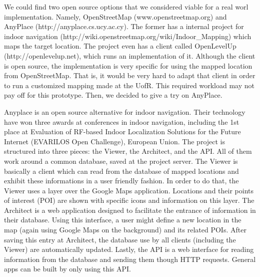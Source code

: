We could find two open source options that we considered viable for a real worl implementation.
Namely, OpenStreetMap (www.openstreetmap.org) and AnyPlace (http://anyplace.cs.ucy.ac.cy).
The former has a internal project for indoor navigation (http://wiki.openstreetmap.org/wiki/Indoor\_Mapping) which maps the target location.
The project even has a client called OpenLevelUp (http://openlevelup.net), which runs an implementation of it.
Although the client is open source, the implementation is very specific for using the mapped location from OpenStreetMap.
That is, it would be very hard to adapt that client in order to run a customized mapping made at the UofR.
This required workload may not pay off for this prototype.
Then, we decided to give a try on AnyPlace.

Anyplace \cite{zeinalipour:IEEEIC16} is an open source alternative for indoor navigation.
Their technology have won three awards at conferences in indoor navigation, including the 1st place at Evaluation of RF-based Indoor Localization Solutions for the Future Internet (EVARILOS Open Challenge), European Union.
The project is structured into three pieces: the Viewer, the Architect, and the API.
All of them work around a common database, saved at the project server.
The Viewer is basically a client which can read from the database of mapped locations and exhibit these informations in a user friendly fashion.
In order to do that, the Viewer uses a layer over the Google Maps application.
Locations and their points of interest (POI) are shown with specific icons and information on this layer.
The Architect is a web application designed to facilitate the entrance of information in their database.
Using this interface, a user might define a new location in the map (again using Google Maps on the background) and its related POIs.
After saving this entry at Architect, the database use by all clients (including the Viewer) are automatically updated.
Lastly, the API is a web interface for reading information from the database and sending them though HTTP requests.
General apps can be built by only using this API.

